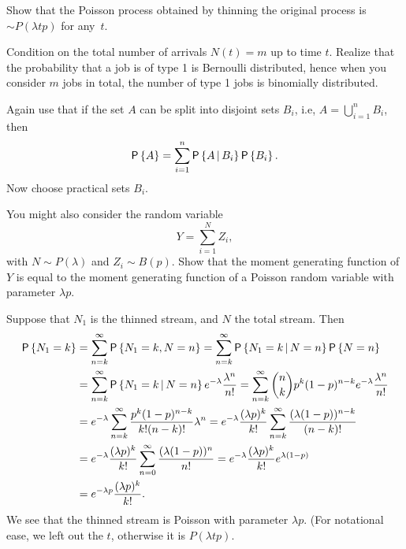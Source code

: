 \begin{exercise}
Show that the Poisson process obtained by thinning the original
  process is $\sim P(\lambda t p)$ for any~$t$.
  \begin{hint}
 Condition on the total number of arrivals $N(t)=m$ up to time
      $t$. Realize that the probability that a job is of type 1 is
      Bernoulli distributed, hence when you consider $m$ jobs in
      total, the number of type 1 jobs is binomially distributed.

      Again use that if the set $A$ can be split into disjoint sets
      $B_i$, i.e, $A=\bigcup_{i=1}^n B_i$, then
    \begin{equation*}
      \P{A} = \sum_{i=1}^n \P{A\given B_i} \P{B_i}.
    \end{equation*}
Now choose practical sets $B_i$. 


You might also consider the random variable 
  \begin{equation*}
    Y = \sum_{i=1}^N Z_i,
  \end{equation*}
  with $N\sim P(\lambda)$ and $Z_i\sim B(p)$. Show that the moment
  generating function of $Y$ is equal to the moment generating
  function of a Poisson random variable with parameter $\lambda p$.
  \end{hint}
    \begin{solution}
Suppose that  $N_1$ is the  thinned stream, and $N$ the total stream. Then
\begin{equation*}
  \begin{split}
    \P{N_1 = k}
&= \sum_{n=k}^\infty \P{N_1 =k, N = n} 
= \sum_{n=k}^\infty \P{N_1 =k\given N = n}\P{N=n} \\
&= \sum_{n=k}^\infty \P{N_1 =k\given N = n}e^{-\lambda} \frac{\lambda^n}{n!}
= \sum_{n=k}^\infty {n \choose k} p^k (1-p)^{n-k} e^{-\lambda} \frac{\lambda^n}{n!}\\
&= e^{-\lambda}\sum_{n=k}^\infty  \frac{p^k (1-p)^{n-k}}{k! (n-k)!} \lambda^n
= e^{-\lambda} \frac{(\lambda p)^k}{k!} \sum_{n=k}^\infty  \frac{(\lambda (1-p))^{n-k}}{(n-k)!}\\
&= e^{-\lambda} \frac{(\lambda p)^k}{k!} \sum_{n=0}^\infty  \frac{(\lambda (1-p))^{n}}{n!}
= e^{-\lambda} \frac{(\lambda p)^k}{k!} e^{\lambda(1-p)} \\
&= e^{-\lambda p} \frac{(\lambda p)^k}{k!}.
  \end{split}
\end{equation*}
We see that the thinned stream is Poisson with parameter $\lambda p$. (For notational ease, we left out the $t$, otherwise it is $P(\lambda t p)$. 


\end{solution}
\end{exercise}
